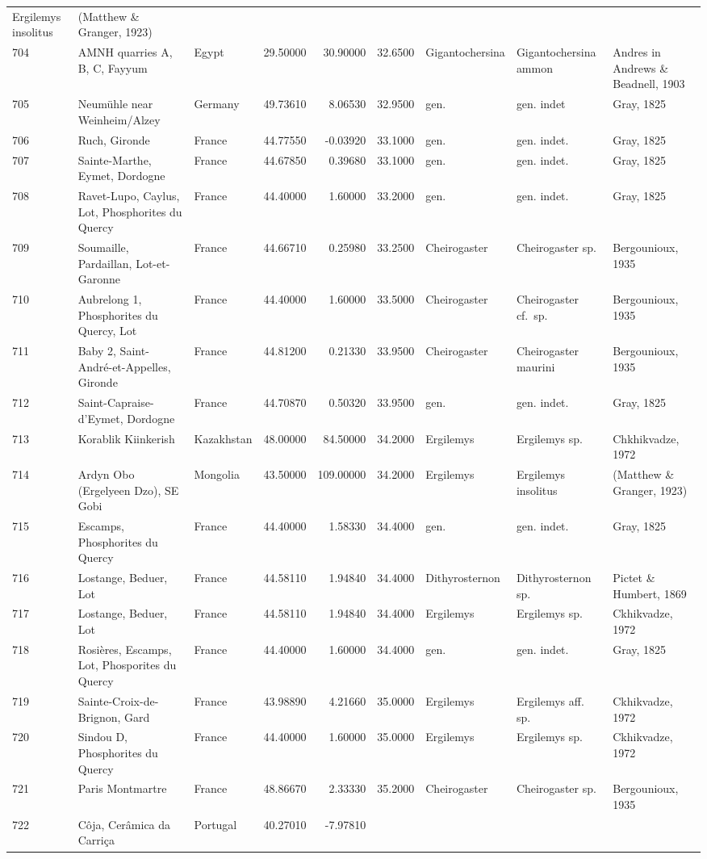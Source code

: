 \begin{landscape}
{\begin{longtable}[]{@{}lllrrrlll@{}}
Ergilemys insolitus & (Matthew \& Granger, 1923)\tabularnewline
704 & AMNH quarries A, B, C, Fayyum & Egypt & 29.50000 & 30.90000 &
32.6500 & Gigantochersina & Gigantochersina ammon & Andres in Andrews \&
Beadnell, 1903\tabularnewline
705 & Neumühle near Weinheim/Alzey & Germany & 49.73610 & 8.06530 &
32.9500 & gen. & gen. indet & Gray, 1825\tabularnewline
706 & Ruch, Gironde & France & 44.77550 & -0.03920 & 33.1000 & gen. &
gen. indet. & Gray, 1825\tabularnewline
707 & Sainte-Marthe, Eymet, Dordogne & France & 44.67850 & 0.39680 &
33.1000 & gen. & gen. indet. & Gray, 1825\tabularnewline
708 & Ravet-Lupo, Caylus, Lot, Phosphorites du Quercy & France &
44.40000 & 1.60000 & 33.2000 & gen. & gen. indet. & Gray,
1825\tabularnewline
709 & Soumaille, Pardaillan, Lot-et-Garonne & France & 44.66710 &
0.25980 & 33.2500 & Cheirogaster & Cheirogaster sp. & Bergounioux,
1935\tabularnewline
710 & Aubrelong 1, Phosphorites du Quercy, Lot & France & 44.40000 &
1.60000 & 33.5000 & Cheirogaster & Cheirogaster cf.~sp. & Bergounioux,
1935\tabularnewline
711 & Baby 2, Saint-André-et-Appelles, Gironde & France & 44.81200 &
0.21330 & 33.9500 & Cheirogaster & Cheirogaster maurini & Bergounioux,
1935\tabularnewline
712 & Saint-Capraise-d'Eymet, Dordogne & France & 44.70870 & 0.50320 &
33.9500 & gen. & gen. indet. & Gray, 1825\tabularnewline
713 & Korablik Kiinkerish & Kazakhstan & 48.00000 & 84.50000 & 34.2000 &
Ergilemys & Ergilemys sp. & Chkhikvadze, 1972\tabularnewline
714 & Ardyn Obo (Ergelyeen Dzo), SE Gobi & Mongolia & 43.50000 &
109.00000 & 34.2000 & Ergilemys & Ergilemys insolitus & (Matthew \&
Granger, 1923)\tabularnewline
715 & Escamps, Phosphorites du Quercy & France & 44.40000 & 1.58330 &
34.4000 & gen. & gen. indet. & Gray, 1825\tabularnewline
716 & Lostange, Beduer, Lot & France & 44.58110 & 1.94840 & 34.4000 &
Dithyrosternon & Dithyrosternon sp. & Pictet \& Humbert,
1869\tabularnewline
717 & Lostange, Beduer, Lot & France & 44.58110 & 1.94840 & 34.4000 &
Ergilemys & Ergilemys sp. & Ckhikvadze, 1972\tabularnewline
718 & Rosières, Escamps, Lot, Phosporites du Quercy & France & 44.40000
& 1.60000 & 34.4000 & gen. & gen. indet. & Gray, 1825\tabularnewline
719 & Sainte-Croix-de-Brignon, Gard & France & 43.98890 & 4.21660 &
35.0000 & Ergilemys & Ergilemys aff. sp. & Ckhikvadze,
1972\tabularnewline
720 & Sindou D, Phosphorites du Quercy & France & 44.40000 & 1.60000 &
35.0000 & Ergilemys & Ergilemys sp. & Ckhikvadze, 1972\tabularnewline
721 & Paris Montmartre & France & 48.86670 & 2.33330 & 35.2000 &
Cheirogaster & Cheirogaster sp. & Bergounioux, 1935\tabularnewline
722 & Côja, Cerâmica da Carriça & Portugal & 40.27010 & -7.97810 &

\end{longtable}}
\end{landscape}
